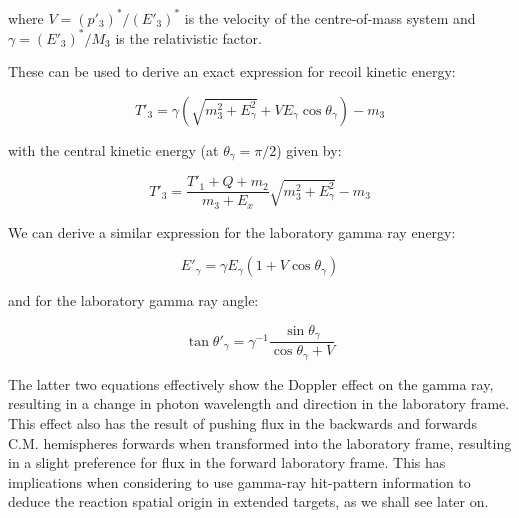 where $V=(p'_{3})^{*}/(E'_{3})^{*}$ is the velocity of the centre-of-mass system and $\gamma=(E'_{3})^{*}/M_{3}$ is the relativistic factor. 

These can be used to derive an exact expression for recoil kinetic energy:

\begin{equation}
\label{eqn:recoilenergy}
T'_{3}=\gamma(\sqrt{m_{3}^{2}+E_{\gamma}^{2}}+VE_{\gamma}\cos{\theta_{\gamma}})-m_{3}
\end{equation}

with the central kinetic energy (at $\theta_{\gamma}=\pi/2$) given by:

\begin{equation}
T'_{3}=\frac{T'_{1}+Q+m_{2}}{m_{3}+E_{x}}\sqrt{m_{3}^{2}+E_{\gamma}^{2}}-m_{3}
\end{equation}

We can derive a similar expression for the laboratory gamma ray energy:

\begin{equation}
E'_{\gamma}=\gamma E_{\gamma}(1+V\cos{\theta_{\gamma}})
\end{equation}

and for the laboratory gamma ray angle:

\begin{equation}
\tan{\theta'_{\gamma}}=\gamma^{-1}\frac{\sin{\theta_{\gamma}}}{\cos{\theta_{\gamma}}+V}
\label{eqn:thetagamma}
\end{equation}

The latter two equations effectively show the Doppler effect on the gamma ray, resulting in a change in photon wavelength and direction in the laboratory frame. This effect also has the result of pushing flux in the backwards and forwards C.M. hemispheres forwards when transformed into the laboratory frame, resulting in a slight preference for flux in the forward laboratory frame. This has implications when considering to use gamma-ray hit-pattern information to deduce the reaction spatial origin in extended targets, as we shall see later on.  

